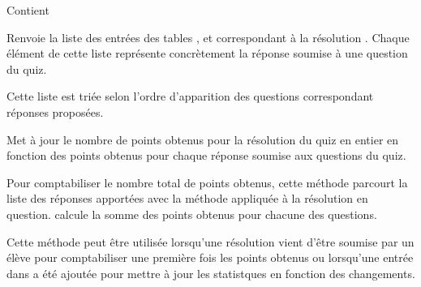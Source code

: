 \documentclass[a4,10pt,french]{sphinxmanual}
\begin{document}
\begin{fulllineitems}
\label{source:quiz.models.CompletedQuiz}
Contient

\begin{fulllineitems}
\label{source:quiz.models.CompletedQuiz.get_questions_submits}
Renvoie la liste des entrées des tables ,  et
 correspondant à la résolution .
Chaque élément de cette liste représente concrètement la réponse soumise à
une question du quiz.

Cette liste est triée selon l'ordre d'apparition des questions correspondant
réponses proposées.

\end{fulllineitems}


\begin{fulllineitems}
\label{source:quiz.models.CompletedQuiz.update_total_result}
Met à jour le nombre de points obtenus pour la résolution du quiz en entier
en fonction des points obtenus pour chaque réponse soumise aux questions
du quiz.

Pour comptabiliser le nombre total de points obtenus, cette méthode parcourt
la liste des réponses apportées avec la méthode {\hyperref[source:quiz.models.CompletedQuiz.get_questions_submits]{\emph{}}}
appliquée à la résolution en question.
calcule la somme des points obtenus pour chacune des questions.

Cette méthode peut être utilisée lorsqu'une résolution vient d'être soumise
par un élève pour comptabiliser une première fois les points obtenus ou 
lorsqu'une entrée dans {\hyperref[source:quiz.models.SqAnswer]{\emph{}}} a été ajoutée pour mettre à jour les
statistques en fonction des changements.

\end{fulllineitems}


\end{fulllineitems}

\end{document}
